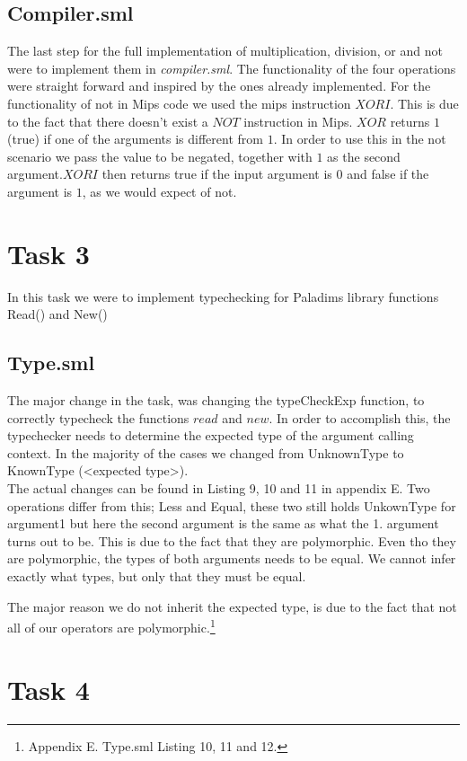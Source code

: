 \documentclass[12pt,a4paper,english]{article}
\begin{document}
\subsection{Compiler.sml}
The last step for the full implementation of multiplication, division, or and not were to implement them in \textit{compiler.sml}. The functionality of the four operations were straight forward and inspired by the ones already implemented. For the functionality of not in Mips code we used the mips instruction $XORI$. This is due to the fact that there doesn't exist a $NOT$ instruction in Mips. $XOR$ returns $1$ (true) if one of the arguments is different from $1$. In order to use this in the not scenario we pass the value to be negated, together with $1$ as the second argument.$XORI$ then returns true if the input argument is $0$ and false if the argument is $1$, as we would expect of not. 

\section{Task 3}
In this task we were to implement typechecking for Paladims library functions Read() and New()
\subsection{Type.sml}
The major change in the task, was changing the typeCheckExp function, to correctly typecheck the functions $read$ and $new$. In order to accomplish this, the typechecker needs to determine the expected type of the argument calling context. In the majority of the cases we changed from UnknownType to KnownType (<expected type>). \\

The actual changes can be found in Listing 9, 10 and 11 in appendix E. Two operations differ from this; Less and Equal, these two still holds UnkownType for argument1 but here the second argument is the same as what the 1. argument turns out to be. This is due to the fact that they are polymorphic. Even tho they are polymorphic, the types of both arguments needs to be equal. We cannot infer exactly what types, but only that they must be equal.

The major reason we do not inherit the expected type, is due to the fact that not all of our operators are polymorphic.\footnote{Appendix E. Type.sml Listing 10, 11 and 12.}

\section{Task 4}
\end{document}
